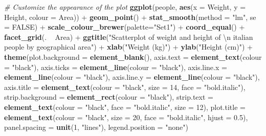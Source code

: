 \documentclass[]{book}
\newenvironment{Shaded}{\begin{snugshade}}{\end{snugshade}}
\newcommand{\KeywordTok}[1]{\textcolor[rgb]{0.13,0.29,0.53}{\textbf{{#1}}}}
\newcommand{\DataTypeTok}[1]{\textcolor[rgb]{0.13,0.29,0.53}{{#1}}}
\newcommand{\DecValTok}[1]{\textcolor[rgb]{0.00,0.00,0.81}{{#1}}}
\newcommand{\FloatTok}[1]{\textcolor[rgb]{0.00,0.00,0.81}{{#1}}}
\newcommand{\CharTok}[1]{\textcolor[rgb]{0.31,0.60,0.02}{{#1}}}
\newcommand{\StringTok}[1]{\textcolor[rgb]{0.31,0.60,0.02}{{#1}}}
\newcommand{\CommentTok}[1]{\textcolor[rgb]{0.56,0.35,0.01}{\textit{{#1}}}}
\newcommand{\OtherTok}[1]{\textcolor[rgb]{0.56,0.35,0.01}{{#1}}}
\newcommand{\NormalTok}[1]{{#1}}
\begin{document}
\begin{Shaded}
\begin{Highlighting}[]
\CommentTok{# Customize the appearance of the plot}
\KeywordTok{ggplot}\NormalTok{(people, }\KeywordTok{aes}\NormalTok{(}\DataTypeTok{x =} \NormalTok{Weight, }\DataTypeTok{y =} \NormalTok{Height, }\DataTypeTok{colour =} \NormalTok{Area)) +}
\StringTok{  }\KeywordTok{geom_point}\NormalTok{() +}
\StringTok{  }\KeywordTok{stat_smooth}\NormalTok{(}\DataTypeTok{method =} \StringTok{"lm"}\NormalTok{, }\DataTypeTok{se =} \OtherTok{FALSE}\NormalTok{) +}
\StringTok{  }\KeywordTok{scale_colour_brewer}\NormalTok{(}\DataTypeTok{palette=}\StringTok{"Set1"}\NormalTok{) +}\StringTok{ }
\StringTok{  }\KeywordTok{coord_equal}\NormalTok{() +}
\StringTok{  }\KeywordTok{facet_grid}\NormalTok{(. ~}\StringTok{ }\NormalTok{Area) +}
\StringTok{  }\KeywordTok{ggtitle}\NormalTok{(}\StringTok{"Scatterplot of weight and height of }\CharTok{\textbackslash{}n}\StringTok{ italian people by geographical area"}\NormalTok{) +}\StringTok{ }
\StringTok{    }\KeywordTok{xlab}\NormalTok{(}\StringTok{"Weight (kg)"}\NormalTok{) +}\StringTok{ }
\StringTok{    }\KeywordTok{ylab}\NormalTok{(}\StringTok{"Height (cm)"}\NormalTok{) +}\StringTok{ }
\StringTok{  }\KeywordTok{theme}\NormalTok{(}\DataTypeTok{plot.background =} \KeywordTok{element_blank}\NormalTok{(), }
    \DataTypeTok{axis.text =} \KeywordTok{element_text}\NormalTok{(}\DataTypeTok{colour =} \StringTok{"black"}\NormalTok{), }
    \DataTypeTok{axis.ticks =} \KeywordTok{element_line}\NormalTok{(}\DataTypeTok{colour =} \StringTok{"black"}\NormalTok{), }
    \DataTypeTok{axis.line.x =} \KeywordTok{element_line}\NormalTok{(}\DataTypeTok{colour =} \StringTok{"black"}\NormalTok{), }
    \DataTypeTok{axis.line.y =} \KeywordTok{element_line}\NormalTok{(}\DataTypeTok{colour =} \StringTok{"black"}\NormalTok{), }
    \DataTypeTok{axis.title =} \KeywordTok{element_text}\NormalTok{(}\DataTypeTok{colour =} \StringTok{"black"}\NormalTok{, }\DataTypeTok{size =} \DecValTok{14}\NormalTok{, }\DataTypeTok{face =} \StringTok{"bold.italic"}\NormalTok{), }
    \DataTypeTok{strip.background =} \KeywordTok{element_rect}\NormalTok{(}\DataTypeTok{colour =} \StringTok{"black"}\NormalTok{), }
    \DataTypeTok{strip.text =} \KeywordTok{element_text}\NormalTok{(}\DataTypeTok{colour =} \StringTok{"black"}\NormalTok{, }\DataTypeTok{face =} \StringTok{"bold.italic"}\NormalTok{, }\DataTypeTok{size =} \DecValTok{12}\NormalTok{), }
    \DataTypeTok{plot.title =} \KeywordTok{element_text}\NormalTok{(}\DataTypeTok{colour =} \StringTok{"black"}\NormalTok{, }\DataTypeTok{size =} \DecValTok{20}\NormalTok{, }\DataTypeTok{face =} \StringTok{"bold.italic"}\NormalTok{, }\DataTypeTok{hjust =} \FloatTok{0.5}\NormalTok{), }
    \DataTypeTok{panel.spacing =} \KeywordTok{unit}\NormalTok{(}\DecValTok{1}\NormalTok{, }\StringTok{"lines"}\NormalTok{), }
    \DataTypeTok{legend.position =} \StringTok{"none"}\NormalTok{) }
\end{Highlighting}
\end{Shaded}
\end{document}
